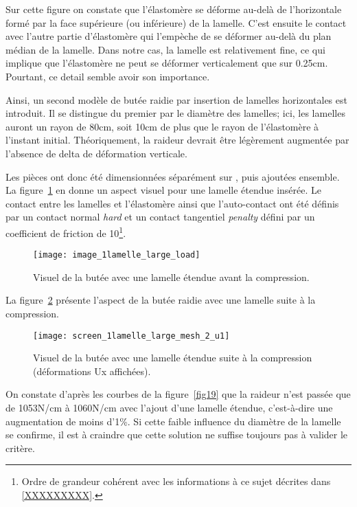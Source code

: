 ﻿\documentclass{article}
\newcommand{\abaqus}{\bsc{Abaqus}\xspace}
\newcommand{\cimg}{0.8}
\begin{document}
Sur cette figure on constate que l'élastomère se déforme au-delà de l'horizontale formé par la face supérieure (ou inférieure) de la lamelle. C'est ensuite le contact avec l'autre partie d'élastomère qui l'empèche de se déformer au-delà du plan médian de la lamelle. Dans notre cas, la lamelle est relativement fine, ce qui implique que l'élastomère ne peut se déformer verticalement que sur 0.25cm. Pourtant, ce detail semble avoir son importance.

Ainsi, un second modèle de butée raidie par insertion de lamelles horizontales est introduit. Il se distingue du premier par le diamètre des lamelles; ici, les lamelles auront un rayon de 80cm, soit 10cm de plus que le rayon de l'élastomère à l'instant initial. Théoriquement, la raideur devrait être légèrement augmentée par l'absence de delta de déformation verticale.

Les pièces ont donc été dimensionnées séparément sur \abaqus, puis ajoutées ensemble. La figure~\ref{fig17} en donne un aspect visuel pour une lamelle étendue insérée. Le contact entre les lamelles et l'élastomère ainsi que l'auto-contact ont été définis par un contact normal \textit{hard} et un contact tangentiel \textit{penalty} défini par un coefficient de friction de 10\footnote{Ordre de grandeur cohérent avec les informations à ce sujet décrites dans \ref{XXXXXXXXX}.}.

\begin{figure}[!h]
	\centering
	\texttt{[image: image\_1lamelle\_large\_load]}
	\caption{Visuel de la butée avec une lamelle étendue avant la compression.}
	\label{fig17}
\end{figure}

La figure~\ref{fig18} présente l'aspect de la butée raidie avec une lamelle suite à la compression.

\begin{figure}[!h]
	\centering
	\texttt{[image: screen\_1lamelle\_large\_mesh\_2\_u1]}
	\caption{Visuel de la butée avec une lamelle étendue suite à la compression (déformations Ux affichées).}
	\label{fig18}
\end{figure}

On constate d'après les courbes de la figure~\ref{fig19} que la raideur n'est passée que de 1053N/cm à 1060N/cm avec l'ajout d'une lamelle étendue, c'est-à-dire une augmentation de moins d'1\%. Si cette faible influence du diamètre de la lamelle se confirme, il est à craindre que cette solution ne suffise toujours pas à valider le critère.
\end{document}
